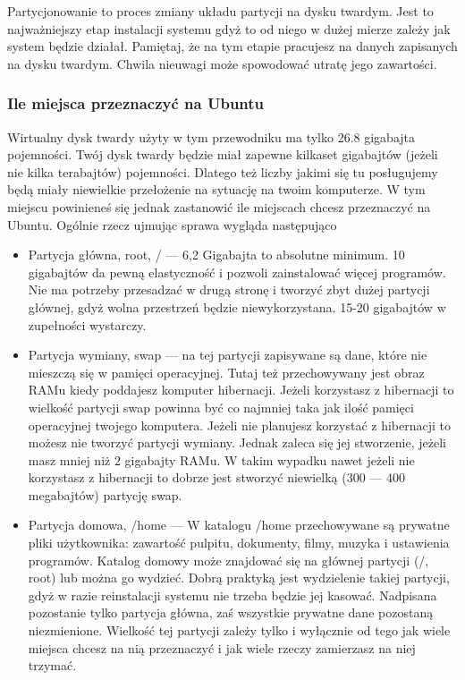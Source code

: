 \label{subsec:partycjonowanie}
Partycjonowanie to proces zmiany układu partycji na dysku twardym. Jest to najważniejszy etap instalacji systemu gdyż to od niego w dużej mierze zależy jak system będzie działał. Pamiętaj, że na tym etapie pracujesz na danych zapisanych na dysku twardym. Chwila nieuwagi może spowodować utratę jego zawartości.
\subsubsection{Ile miejsca przeznaczyć na Ubuntu}
\label{ile_miejsca}
Wirtualny dysk twardy użyty w tym przewodniku ma tylko 26.8 gigabajta pojemności. Twój dysk twardy będzie miał zapewne kilkaset gigabajtów (jeżeli nie kilka terabajtów) pojemności. Dlatego też liczby jakimi się tu posługujemy będą miały niewielkie przełożenie na sytuację na twoim komputerze. W tym miejscu powinieneś się jednak zastanowić ile miejscach chcesz przeznaczyć na Ubuntu.
Ogólnie rzecz ujmując sprawa wygląda następująco
\begin{itemize}
\item \textcolor{ubuntu_orange}{Partycja główna, root, /} --- 6,2 Gigabajta to absolutne minimum. 10 gigabajtów da pewną elastyczność i pozwoli zainstalować więcej programów. Nie ma potrzeby przesadzać w drugą stronę i tworzyć zbyt dużej partycji głównej, gdyż wolna przestrzeń będzie niewykorzystana. 15-20 gigabajtów w zupełności wystarczy.
\item \textcolor{ubuntu_orange}{Partycja wymiany, swap} --- na tej partycji zapisywane są dane, które nie mieszczą się w pamięci operacyjnej. Tutaj też przechowywany jest obraz RAMu kiedy poddajesz komputer hibernacji. Jeżeli korzystasz z hibernacji to wielkość partycji swap powinna być co najmniej taka jak ilość pamięci operacyjnej twojego komputera. Jeżeli nie planujesz korzystać z hibernacji to możesz nie tworzyć partycji wymiany. Jednak zaleca się jej stworzenie, jeżeli masz mniej niż 2 gigabajty RAMu. W takim wypadku nawet jeżeli nie korzystasz z hibernacji to dobrze jest stworzyć niewielką (300 --- 400 megabajtów) partycję swap.
\item \textcolor{ubuntu_orange}{Partycja domowa, /home} --- W katalogu /home przechowywane są prywatne pliki użytkownika: zawartość pulpitu, dokumenty, filmy, muzyka i ustawienia programów. Katalog domowy może znajdować się na głównej partycji (/, root) lub można go wydzieć. Dobrą praktyką jest wydzielenie takiej partycji, gdyż w razie reinstalacji systemu nie trzeba będzie jej kasować. Nadpisana pozostanie tylko partycja główna, zaś wszystkie prywatne dane pozostaną niezmienione. Wielkość tej partycji zależy tylko i wyłącznie od tego jak wiele miejsca chcesz na nią przeznaczyć i jak wiele rzeczy zamierzasz na niej trzymać. 
\end{itemize}
\clearpage
